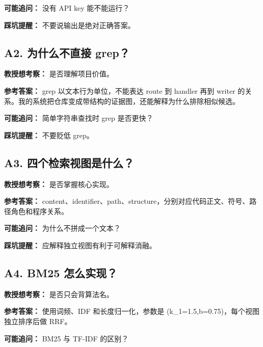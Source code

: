 \documentclass[UTF8,12pt,openany]{ctexbook}
\begin{document}
\textbf{可能追问：} 没有 API key 能不能运行？\par

\textbf{踩坑提醒：} 不要说输出是绝对正确答案。\par

\subsection{A2. 为什么不直接 grep？}

\textbf{教授想考察：} 是否理解项目价值。\par

\textbf{参考答案：} grep 以文本行为单位，不能表达 route 到 handler 再到 writer 的关系。我的系统把仓库变成带结构的证据图，还能解释为什么排除相似候选。\par

\textbf{可能追问：} 简单字符串查找时 grep 是否更快？\par

\textbf{踩坑提醒：} 不要贬低 grep。\par

\subsection{A3. 四个检索视图是什么？}

\textbf{教授想考察：} 是否掌握核心实现。\par

\textbf{参考答案：} content、identifier、path、structure，分别对应代码正文、符号、路径角色和程序关系。\par

\textbf{可能追问：} 为什么不拼成一个文本？\par

\textbf{踩坑提醒：} 应解释独立视图有利于可解释消融。\par

\subsection{A4. BM25 怎么实现？}

\textbf{教授想考察：} 是否只会背算法名。\par

\textbf{参考答案：} 使用词频、IDF 和长度归一化，参数是 (k\_1=1.5,b=0.75)，每个视图独立排序后做 RRF。\par

\textbf{可能追问：} BM25 与 TF-IDF 的区别？\par
\end{document}
